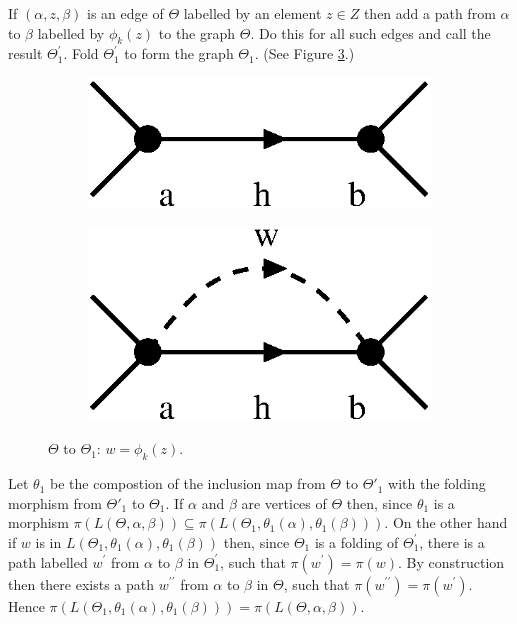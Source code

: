 \documentclass[a4paper,12pt]{article}
\renewcommand{\a}{\alpha }
\renewcommand{\b}{\beta }
\newcommand{\T}{\Theta }
\numberwithin{equation}{section}
\numberwithin{figure}{section}
\begin{document}
 If $(\a,z,\b)$ is an
edge of $\T$ labelled by an element $z\in Z$ then add a path from
$\a$ to $\b$ labelled by $\phi_k(z)$ to the graph $\T$. Do this
for all such edges and call the result
$\T_1^\prime$. Fold $\T_1^\prime$ to form the graph
$\T_1$. (See Figure \ref{fig:alg2-1}.)
\begin{figure}
\begin{center}
\psfrag{a}{$\a$}
\psfrag{b}{$\b$}
\begin{subfigure}[b]{.25\columnwidth}
\includegraphics[scale=.5]{alg2-1a.eps}
\label{fig:alg2-1a}
\end{subfigure}
\raisebox{3ex}{$\leadsto$}
\begin{subfigure}[b]{.25\columnwidth}
\psfrag{a}{$\a$}
\psfrag{b}{$\b$}
\includegraphics[scale=.5]{alg2-1b.eps}
\label{fig:alg2-1b}
\end{subfigure}
\end{center}
\caption{$\Theta$ to $\Theta_1$: $w=\phi_k(z)$.}\label{fig:alg2-1}
\end{figure}
Let $\theta_1$ be the compostion of the inclusion map from 
$\Theta$ to $\Theta'_1$ with the folding morphism from $\Theta'_1$ to
$\Theta_1$. If $\a$ and $\b$ are vertices of $\Theta$ then,
since $\theta_1$ is a morphism
$\pi(L(\Theta, \a,\b))\subseteq \pi(L(\Theta_1,\theta_1(\a),\theta_1(\b)))$.
On the other hand if $w$ is in  $L(\Theta_1,\theta_1(\a),\theta_1(\b))$
then, since $\Theta_1$ is a folding of $\Theta_1^\prime$,
 there is a path labelled $w^\prime$ from $\a$ to $\b$ in $\Theta_1^\prime$,
such that $\pi(w^\prime)=\pi(w)$.
By construction then there exists  a path $w^{\prime\prime}$ from
$\a$ to $\b$ in $\Theta$, such that $\pi(w^{\prime\prime}) =
\pi(w^\prime)$. Hence $\pi(L(\Theta_1,\theta_1(\a),\theta_1(\b)))
= \pi(L(\Theta, \a,\b))$.  \\[1em]
\end{document}
